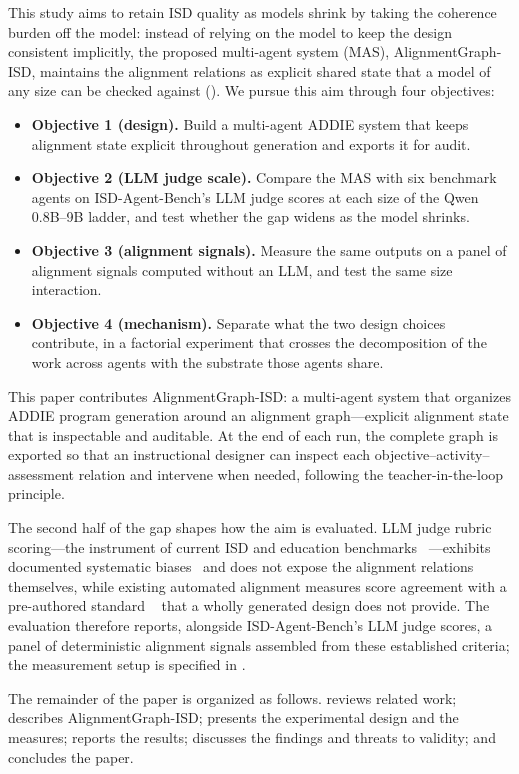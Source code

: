 This study aims to retain ISD quality as models shrink by taking the coherence
burden off the model: instead of relying on the model to keep the design
consistent implicitly, the proposed multi-agent system (MAS),
AlignmentGraph-ISD, maintains the alignment relations as explicit shared state
that a model of any size can be checked against (). We pursue this aim through four objectives:
\begin{itemize}
  \item \textbf{Objective 1 (design).} Build a multi-agent ADDIE system that
  keeps alignment state explicit throughout generation and exports it for audit.
  \item \textbf{Objective 2 (LLM judge scale).} Compare the MAS with six
  benchmark agents on ISD-Agent-Bench's LLM judge scores at each size of the Qwen
  0.8B--9B ladder, and test whether the gap widens as the model shrinks.
  \item \textbf{Objective 3 (alignment signals).} Measure the same outputs on a
  panel of alignment signals computed without an LLM, and test the same size
  interaction.
  \item \textbf{Objective 4 (mechanism).} Separate what the two design choices
  contribute, in a factorial experiment that crosses the decomposition of the
  work across agents with the substrate those agents share.
\end{itemize}

This paper contributes AlignmentGraph-ISD: a multi-agent system that organizes
ADDIE program generation around an alignment graph---explicit alignment state that
is inspectable and auditable. At the end of each run, the complete graph is
exported so that an instructional designer can inspect each
objective--activity--assessment relation and intervene when needed, following the
teacher-in-the-loop principle.

The second half of the gap shapes how the aim is evaluated. LLM judge
rubric scoring---the instrument of current ISD and education benchmarks
~\cite{isdagentbench,edubench2025,tutorbench2025,mathtutorbench2025}---exhibits
documented systematic biases~\cite{zheng2023judging,panickssery2024llm} and does
not expose the alignment relations themselves, while existing automated
alignment measures score agreement with a pre-authored standard
~\cite{porter2002measuring,webb1997criteria,xu2025itemalignment,silva2026lessonbench}
that a wholly generated design does not provide. The evaluation therefore
reports, alongside ISD-Agent-Bench's LLM judge scores, a panel of deterministic
alignment signals assembled from these established criteria; the measurement
setup is specified in .

The remainder of the paper is organized as follows. 
reviews related work;  describes AlignmentGraph-ISD;
 presents the experimental design and the
measures;  reports the results;
 discusses the findings and threats to validity; and
 concludes the paper.
